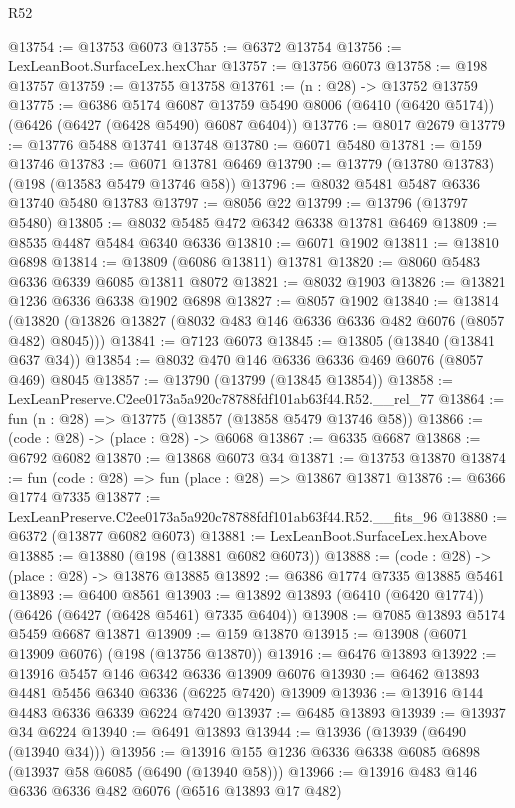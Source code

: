 \begin{lexlean}{R52}
\begin{coremodule}
@13754 := @13753 @6073
@13755 := @6372 @13754
@13756 := LexLeanBoot.SurfaceLex.hexChar
@13757 := @13756 @6073
@13758 := @198 @13757
@13759 := @13755 @13758
@13761 := (n : @28) -> @13752 @13759
@13775 := @6386
    @5174
    @6087
    @13759
    @5490
    @8006
    (@6410 (@6420 @5174))
    (@6426 (@6427 (@6428 @5490) @6087 @6404))
@13776 := @8017 @2679
@13779 := @13776 @5488 @13741 @13748
@13780 := @6071 @5480
@13781 := @159 @13746
@13783 := @6071 @13781 @6469
@13790 := @13779 (@13780 @13783) (@198 (@13583 @5479 @13746 @58))
@13796 := @8032 @5481 @5487 @6336 @13740 @5480 @13783
@13797 := @8056 @22
@13799 := @13796 (@13797 @5480)
@13805 := @8032 @5485 @472 @6342 @6338 @13781 @6469
@13809 := @8535 @4487 @5484 @6340 @6336
@13810 := @6071 @1902
@13811 := @13810 @6898
@13814 := @13809 (@6086 @13811) @13781
@13820 := @8060 @5483 @6336 @6339 @6085 @13811 @8072
@13821 := @8032 @1903
@13826 := @13821 @1236 @6336 @6338 @1902 @6898
@13827 := @8057 @1902
@13840 := @13814
    (@13820 (@13826 @13827 (@8032 @483 @146 @6336 @6336 @482 @6076 (@8057 @482) @8045)))
@13841 := @7123 @6073
@13845 := @13805 (@13840 (@13841 @637 @34))
@13854 := @8032 @470 @146 @6336 @6336 @469 @6076 (@8057 @469) @8045
@13857 := @13790 (@13799 (@13845 @13854))
@13858 := LexLeanPreserve.C2ee0173a5a920c78788fdf101ab63f44.R52.__rel_77
@13864 := fun (n : @28) => @13775 (@13857 (@13858 @5479 @13746 @58))
@13866 := (code : @28) -> (place : @28) -> @6068
@13867 := @6335 @6687
@13868 := @6792 @6082
@13870 := @13868 @6073 @34
@13871 := @13753 @13870
@13874 := fun (code : @28) => fun (place : @28) => @13867 @13871
@13876 := @6366 @1774 @7335
@13877 := LexLeanPreserve.C2ee0173a5a920c78788fdf101ab63f44.R52.__fits_96
@13880 := @6372 (@13877 @6082 @6073)
@13881 := LexLeanBoot.SurfaceLex.hexAbove
@13885 := @13880 (@198 (@13881 @6082 @6073))
@13888 := (code : @28) -> (place : @28) -> @13876 @13885
@13892 := @6386 @1774 @7335 @13885 @5461
@13893 := @6400 @8561
@13903 := @13892 @13893 (@6410 (@6420 @1774)) (@6426 (@6427 (@6428 @5461) @7335 @6404))
@13908 := @7085 @13893 @5174 @5459 @6687 @13871
@13909 := @159 @13870
@13915 := @13908 (@6071 @13909 @6076) (@198 (@13756 @13870))
@13916 := @6476 @13893
@13922 := @13916 @5457 @146 @6342 @6336 @13909 @6076
@13930 := @6462 @13893 @4481 @5456 @6340 @6336 (@6225 @7420) @13909
@13936 := @13916 @144 @4483 @6336 @6339 @6224 @7420
@13937 := @6485 @13893
@13939 := @13937 @34 @6224
@13940 := @6491 @13893
@13944 := @13936 (@13939 (@6490 (@13940 @34)))
@13956 := @13916 @155 @1236 @6336 @6338 @6085 @6898 (@13937 @58 @6085 (@6490 (@13940 @58)))
@13966 := @13916 @483 @146 @6336 @6336 @482 @6076 (@6516 @13893 @17 @482)

\end{coremodule}
\end{lexlean}

